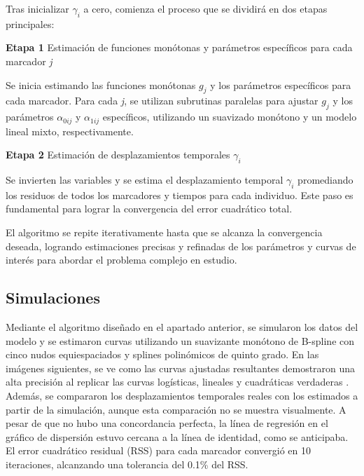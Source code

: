 	Tras inicializar $\gamma_{i}$ a cero, comienza el proceso que se dividirá en dos etapas principales:
	\begin{description}
		\item {\textbf{Etapa 1}} Estimación de funciones monótonas y parámetros específicos para cada marcador \textit{j}
		
		Se inicia estimando las funciones monótonas $g_{j}$	y los parámetros específicos para cada marcador. Para cada \textit{j}, se utilizan subrutinas paralelas para ajustar $g_{j}$
		y los parámetros $\alpha_{0ij}$ y $\alpha_{1ij}$ específicos, utilizando un suavizado monótono y un modelo lineal mixto, respectivamente.
		\item {\textbf{Etapa 2}} Estimación de desplazamientos temporales $\gamma_{i}$
		
		Se invierten las variables y se estima el desplazamiento temporal $\gamma_{i}$ promediando los residuos de todos los marcadores y tiempos para cada individuo. Este paso es fundamental para lograr la convergencia del error cuadrático total.
	\end{description}
	
	El algoritmo se repite iterativamente hasta que se alcanza la convergencia deseada, logrando estimaciones precisas y refinadas de los parámetros y curvas de interés para abordar el problema complejo en estudio.
	
	\subsection{Simulaciones}
	Mediante el algoritmo diseñado en el apartado anterior, se simularon los datos del modelo y se estimaron curvas utilizando un suavizante monótono de B-spline con cinco nudos equiespaciados y splines polinómicos de quinto grado. En las imágenes siguientes, se ve como las curvas ajustadas resultantes demostraron una alta precisión al replicar las curvas logísticas, lineales y cuadráticas verdaderas .\\
	
	Además, se compararon los desplazamientos temporales reales con los estimados a partir de la simulación, aunque esta comparación no se muestra visualmente. A pesar de que no hubo una concordancia perfecta, la línea de regresión en el gráfico de dispersión estuvo cercana a la línea de identidad, como se anticipaba. El error cuadrático residual (RSS) para cada marcador convergió en 10 iteraciones, alcanzando una tolerancia del 0.1\% del RSS.
	

